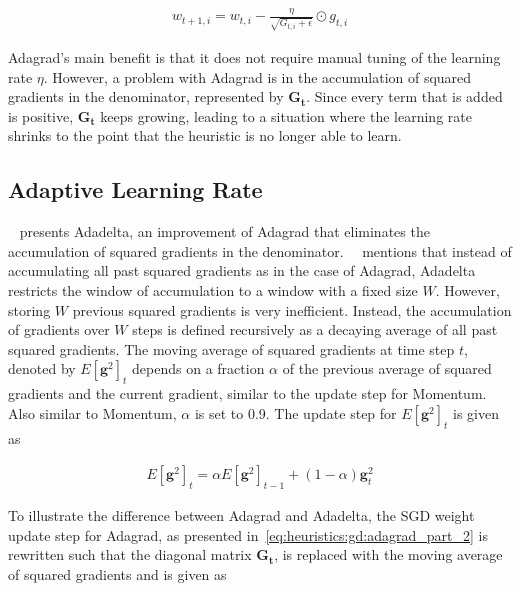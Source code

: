\begin{equation}
      \label{eq:heuristics:gd:adagrad_part_2}
      \begin{split}
            w_{t+1,i} = w_{t,i} - \frac{\eta}{\sqrt{G_{t,i} + \epsilon}} \odot g_{t,i}
      \end{split}
\end{equation}

\Ac{Adagrad}'s main benefit is that it does not require manual tuning of the learning rate $\eta$. However, a problem with \acs{Adagrad} is in the accumulation of squared gradients in the denominator, represented by $\boldsymbol{G_{t}}$. Since every term that is added is positive, $\boldsymbol{G_{t}}$ keeps growing, leading to a situation where the learning rate shrinks to the point that the heuristic is no longer able to learn.

\subsection{Adaptive Learning Rate}\label{sec:heuristics:adadelta}

\citeauthor{ref:zeiler:2012}~\cite{ref:zeiler:2012} presents \acs{Adadelta}, an improvement of \acs{Adagrad} that eliminates the accumulation of squared gradients in the denominator.~\citeauthor{ref:ruder:2016}~\cite{ref:ruder:2016} mentions that instead of accumulating all past squared gradients as in the case of \acs{Adagrad}, \acs{Adadelta} restricts the window of accumulation to a window with a fixed size $W$. However, storing $W$ previous squared gradients is very inefficient. Instead, the accumulation of gradients over $W$ steps is defined recursively as a decaying average of all past squared gradients. The moving average of squared gradients at time step $t$, denoted by $E[\boldsymbol{g}^{2}]_{t}$  depends on a fraction $\alpha$ of the previous average of squared gradients and the current gradient, similar to the update step for \acs{Momentum}. Also similar to \acs{Momentum}, $\alpha$ is set to 0.9. The update step for $E[\boldsymbol{g}^{2}]_{t}$ is given as

\begin{equation}
      \label{eq:heuristics:gd:adadelta_part_1}
      \begin{split}
            E[\boldsymbol{g}^{2}]_{t} = \alpha E[\boldsymbol{g}^{2}]_{t - 1} + (1 - \alpha)\boldsymbol{g}_{t}^{2}
      \end{split}
\end{equation}

To illustrate the difference between \acs{Adagrad} and \acs{Adadelta}, the \acs{SGD} weight update step for \acs{Adagrad}, as presented in~\eqref{eq:heuristics:gd:adagrad_part_2} is rewritten such that the diagonal matrix $\boldsymbol{G_{t}}$, is replaced with the moving average of squared gradients and is given as

